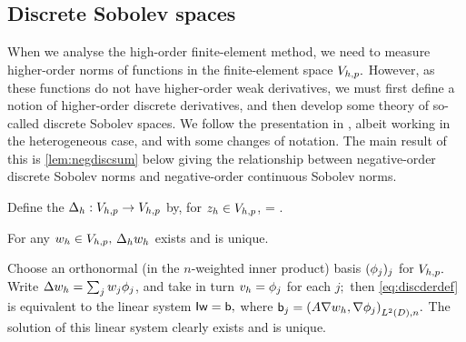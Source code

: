 \subsection{Discrete Sobolev spaces}\label{sec:discsob}
When we analyse the high-order finite-element method, we need to measure higher-order norms of functions in the finite-element space $V_{h,p}.$ However, as these functions do not have higher-order weak derivatives, we must first define a notion of higher-order discrete derivatives, and then develop some theory of so-called discrete Sobolev spaces. We follow the presentation in \cite{DuWu:15}, albeit working in the heterogeneous case, and with some changes of notation. The main result of this  is \cref{lem:negdiscsum} below giving the relationship between negative-order discrete Sobolev norms and negative-order continuous Sobolev norms.

Define the  $\Delta_{h}:V_{h,p}\rightarrow V_{h,p}$ by, for $z_{h} \in V_{h,p}$,
\beq\label{eq:discderdef}
\IPLtDn{\Deltah \zh}{\vh} =  \tforall \vh \in \Vhp.
\eeq
\ede

\label{lem:ddwd}
For any $w_{h} \in V_{h,p},$ $\Delta_{h} w_{h}$ exists and is unique.
\ele

Choose an orthonormal (in the $n$-weighted inner product) basis  $(\phi_{j})_j$ for $V_{h,p}.$ Write $\Delta w_{h} = \sum_j w_{j} \phi_{j}$, and take in turn $v_{h} = \phi_{j}$ for each $j;$ then \cref{eq:discderdef} is equivalent to the linear system $\mathsf{I} \mathsf{w} = \mathsf{b},$ where $\bvec_{j} = \IPLtDn{A \grad \wh}{\grad \phij}.$ The solution of this linear system clearly exists and is unique.
\epf

